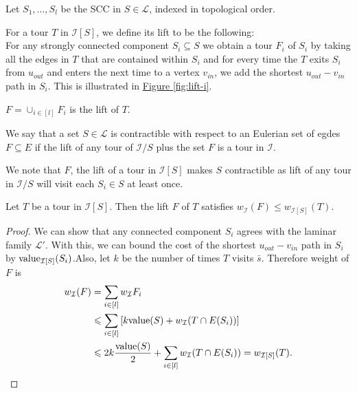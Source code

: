 \documentclass[./main.tex]{subfiles}
\newcommand{\calI}{\ensuremath{\mathcal{I}}}
\newcommand{\calL}{\ensuremath{\mathcal{L}}}
\begin{document}
	Let $S_1, \dots, S_l$ be the SCC in $S \in \calL$, indexed in topological order.
	\begin{definition}\label{def:3:indu-lift}
		For a tour $T$ in $\calI[S]$, we define its lift to be the following:\\
		For any strongly connected component $S_i \subseteq S$ we obtain a tour $F_i$ of $S_i$ by taking all the edges in $T$ that are contained within $S_i$ and for every time the $T$ exits $S_i$ from $u_{out}$ and enters the next time to a vertex $v_{in}$, we add the shortest $u_{out} - v_{in}$ path in $S_i$. This is illustrated in \hyperref[fig:lift-i]{Figure \ref{fig:lift-i}}.
		
		$F = \cup_{i \in [l]} F_i$ is the lift of $T$.
	\end{definition}\vspace{2mm}
	\begin{definition}
		We say that a set $S \in \calL$ is contractible with respect to an Eulerian set of egdes $F \subseteq E$ if the lift of any tour of $\calI/S$ plus the set $F$ is a tour in $\calI$.
	\end{definition}\vspace{2mm}
	We note that $F$, the lift of a tour in $\calI[S]$ makes $S$ contractible as lift of any tour in $\calI/S$ will visit each $S_i \in S$ at least once.
		
	\begin{lemma}\label{lemm:3:lift-i}
		Let $T$ be a tour in $\calI[S]$. Then the lift $F$ of $T$ satisfies $w_\calI(F) \leqslant w_{\calI[S]}(T).$
	\end{lemma}
	\begin{proof}
		We can show that any connected component $S_i$ agrees with the laminar family $\calL'$. With this, we can bound the cost of the shortest $u_{out} - v_{in}$ path in $S_i$ by $\val_{\calI[S]}(S_i)$.Also, let $k$ be the number of times $T$ visits $\bar{s}$. Therefore weight of $F$ is
		\begin{align*}
			w_{\calI}(F) &= \sum_{i \in [l]} w_{\calI}F_i\\
			&\leqslant \sum_{i \in [l]} \left[k\val(S) + w_{\calI}(T \cap E(S_i))\right]\\
			&\leqslant 2k \frac{\val(S)}{2} + \sum_{i \in [l]}w_{\calI}(T \cap E(S_i)) = w_{\calI[S]}(T).
		\end{align*}
	\end{proof}
\end{document}
